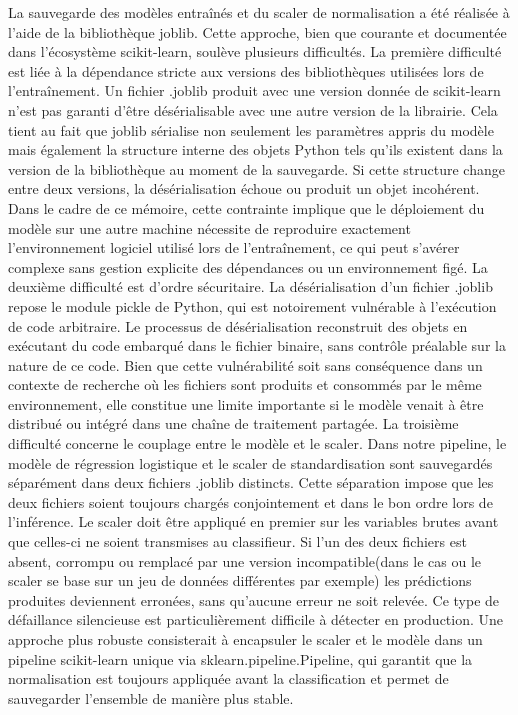 La sauvegarde des modèles entraînés et du scaler de normalisation a été réalisée
à l'aide de la bibliothèque joblib. Cette approche, bien que courante et documentée dans
l'écosystème scikit-learn, soulève plusieurs difficultés. La première difficulté est liée à la
dépendance stricte aux versions des bibliothèques utilisées lors de
l'entraînement. Un fichier .joblib produit avec une version donnée de
scikit-learn n'est pas garanti d'être désérialisable avec une autre version de la librairie.
Cela tient au fait que joblib sérialise non seulement les
paramètres appris du modèle mais également la structure interne des objets
Python tels qu'ils existent dans la version de la bibliothèque au moment de la
sauvegarde. Si cette structure change entre deux versions, la désérialisation
échoue ou produit un objet incohérent. Dans le cadre de ce mémoire,
cette contrainte implique que le déploiement du modèle sur une autre machine
nécessite de reproduire exactement l'environnement logiciel utilisé lors de
l'entraînement, ce qui peut s'avérer complexe sans gestion explicite des
dépendances ou un environnement figé. La
deuxième difficulté est d'ordre sécuritaire. La désérialisation d'un fichier .joblib 
repose le module pickle de Python, qui est notoirement
vulnérable à l'exécution de code arbitraire. Le processus de désérialisation
reconstruit des objets en exécutant du code embarqué dans le fichier
binaire, sans contrôle préalable sur la nature de ce code. Bien que cette
vulnérabilité soit sans conséquence dans un contexte de recherche où les
fichiers sont produits et consommés par le même environnement, elle constitue
une limite importante si le modèle venait à être distribué ou intégré dans une
chaîne de traitement partagée. La troisième difficulté concerne le couplage entre le modèle et le scaler.
Dans notre pipeline, le
modèle de régression logistique et le scaler de standardisation sont sauvegardés
séparément dans deux fichiers .joblib distincts. Cette séparation impose que les
deux fichiers soient toujours chargés conjointement et dans le bon ordre lors de
l'inférence. Le scaler doit être appliqué en premier sur les variables brutes avant que
celles-ci ne soient transmises au classifieur. Si l'un des deux fichiers est
absent, corrompu ou remplacé par une version incompatible(dans le cas ou le scaler se base sur un jeu de données différentes par exemple)
les prédictions produites deviennent erronées, sans qu'aucune erreur ne soit relevée. Ce type de défaillance
silencieuse est particulièrement difficile à détecter en production. Une approche plus robuste consisterait à encapsuler le scaler et le modèle
dans un pipeline scikit-learn unique via sklearn.pipeline.Pipeline, qui garantit que la normalisation est toujours appliquée
avant la classification et permet de sauvegarder l'ensemble de manière plus stable.

